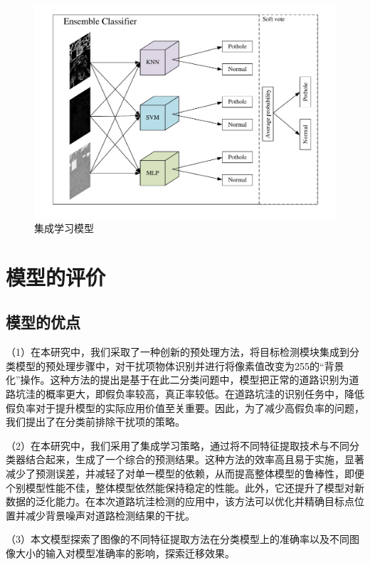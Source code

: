 \documentclass[a4paper, 10pt]{article}
\begin{document}
	\begin{figure}[htb]
		\centering 
		\includegraphics[width=0.8\columnwidth]{picture/Ensemble Classifier}
		\caption{
			\label{fig: Ensemble Classifier} 
			集成学习模型
		}
	\end{figure}
	
	\section{模型的评价}
	
	\subsection{模型的优点}
	
	（1）在本研究中，我们采取了一种创新的预处理方法，将目标检测模块集成到分类模型的预处理步骤中，对干扰项物体识别并进行将像素值改变为255的“背景化”操作。这种方法的提出是基于在此二分类问题中，模型把正常的道路识别为道路坑洼的概率更大，即假负率较高，真正率较低。在道路坑洼的识别任务中，降低假负率对于提升模型的实际应用价值至关重要。因此，为了减少高假负率的问题，我们提出了在分类前排除干扰项的策略。
	
	（2）在本研究中，我们采用了集成学习策略，通过将不同特征提取技术与不同分类器结合起来，生成了一个综合的预测结果。这种方法的效率高且易于实施，显著减少了预测误差，并减轻了对单一模型的依赖，从而提高整体模型的鲁棒性，即便个别模型性能不佳，整体模型依然能保持稳定的性能。此外，它还提升了模型对新数据的泛化能力。在本次道路坑洼检测的应用中，该方法可以优化并精确目标点位置并减少背景噪声对道路检测结果的干扰。
	
	（3）本文模型探索了图像的不同特征提取方法在分类模型上的准确率以及不同图像大小的输入对模型准确率的影响，探索迁移效果。
	
\end{document}
